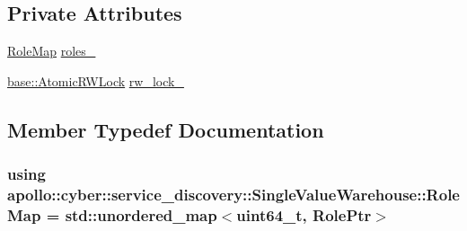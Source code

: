 \subsection*{Private Attributes}
\begin{DoxyCompactItemize}
\item 
\hyperlink{classapollo_1_1cyber_1_1service__discovery_1_1SingleValueWarehouse_a8f248187a1dd8abbcf81969435791333}{Role\-Map} \hyperlink{classapollo_1_1cyber_1_1service__discovery_1_1SingleValueWarehouse_a4d77e4cd0c9a64f08f73ae2087cf8475}{roles\-\_\-}
\item 
\hyperlink{classapollo_1_1cyber_1_1base_1_1AtomicRWLock}{base\-::\-Atomic\-R\-W\-Lock} \hyperlink{classapollo_1_1cyber_1_1service__discovery_1_1SingleValueWarehouse_a4c99437ca1c59fcc5b3448c2c909e73a}{rw\-\_\-lock\-\_\-}
\end{DoxyCompactItemize}


\subsection{Member Typedef Documentation}
\hypertarget{classapollo_1_1cyber_1_1service__discovery_1_1SingleValueWarehouse_a8f248187a1dd8abbcf81969435791333}{
\subsubsection[{Role\-Map}]{\setlength{\rightskip}{0pt plus 5cm}using {\bf apollo\-::cyber\-::service\-\_\-discovery\-::\-Single\-Value\-Warehouse\-::\-Role\-Map} =  std\-::unordered\-\_\-map$<$uint64\-\_\-t, {\bf Role\-Ptr}$>$}}\label{classapollo_1_1cyber_1_1service__discovery_1_1SingleValueWarehouse_a8f248187a1dd8abbcf81969435791333}


